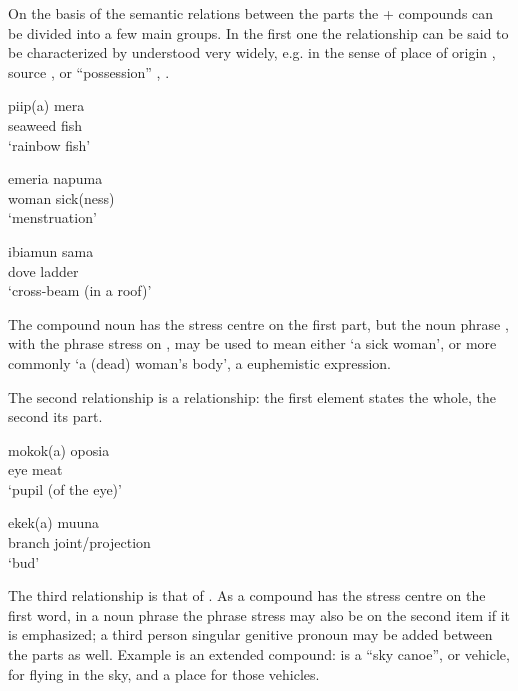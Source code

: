On the basis of the semantic relations between the parts the + compounds can be divided into a few main groups. In the first one the relationship can be said to be characterized by  understood very widely, e.g. in the sense of place of origin , source , or ``possession'' , . 

\ea%
\label{ex:3:x37}
\gll piip(a) mera \\
seaweed fish\\
\glt`rainbow fish'
\z

\ea%
\label{ex:3:x40}
\gll emeria napuma \\
woman sick(ness)\\
\glt`menstruation'
\z

\ea%
\label{ex:3:x41}
\gll ibiamun sama \\
dove ladder\\
\glt`cross-beam (in a roof)'
\z

The compound noun  has the stress centre on the first part, but the noun phrase , with the phrase stress on , may be used to mean either `a sick woman', or more commonly `a (dead) woman's body', a euphemistic expression. 

The second relationship is a  relationship: the first element states the whole, the second its part.

\ea%
\label{ex:3:x42}
\gll mokok(a) oposia \\
eye meat\\
\glt`pupil (of the eye)'
\z

\ea%
\label{ex:3:x43}
\gll ekek(a) muuna \\
branch joint/projection\\
\glt`bud'
\z

The third relationship is that of . As a compound   has the stress centre on the first word, in a noun phrase  the phrase stress may also be on the second item if it is emphasized; a third person singular genitive pronoun may be added between the parts as well. Example  is an extended compound:  is a ``sky canoe'', or vehicle, for flying in the sky, and  a place for those vehicles.

